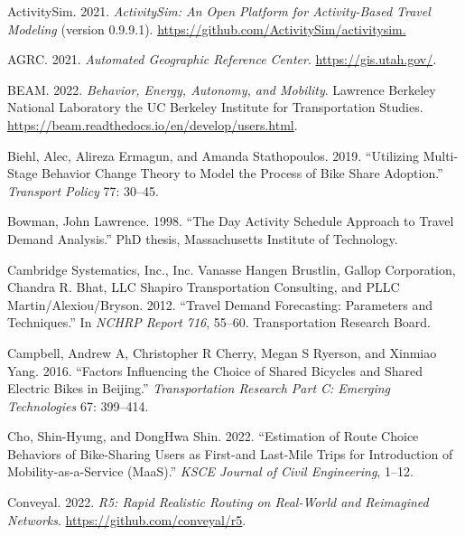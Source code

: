 \documentclass[12pt, oneside, openright]{byuthesis}
\newlength{\cslhangindent}
\newlength{\cslentryspacingunit} %
\newenvironment{CSLReferences}[2] %
 {%
  \setlength{\parindent}{0pt}
  \ifodd #1
  \let\oldpar\par
  \def\par{\hangindent=\cslhangindent\oldpar}
  \fi
  \setlength{\parskip}{#2\cslentryspacingunit}
 }%
 {}
\begin{document}
\hypertarget{refs}{}
\begin{CSLReferences}{1}{0}
\leavevmode{}%
ActivitySim. 2021. \emph{ActivitySim: An Open Platform for Activity-Based Travel Modeling} (version 0.9.9.1). \url{https://github.com/ActivitySim/activitysim.}

\leavevmode{}%
AGRC. 2021. \emph{Automated Geographic Reference Center}. \url{https://gis.utah.gov/}.

\leavevmode{}%
BEAM. 2022. \emph{Behavior, Energy, Autonomy, and Mobility}. Lawrence Berkeley National Laboratory the UC Berkeley Institute for Transportation Studies. \url{https://beam.readthedocs.io/en/develop/users.html}.

\leavevmode{}%
Biehl, Alec, Alireza Ermagun, and Amanda Stathopoulos. 2019. {``Utilizing Multi-Stage Behavior Change Theory to Model the Process of Bike Share Adoption.''} \emph{Transport Policy} 77: 30--45.

\leavevmode{}%
Bowman, John Lawrence. 1998. {``The Day Activity Schedule Approach to Travel Demand Analysis.''} PhD thesis, Massachusetts Institute of Technology.

\leavevmode{}%
Cambridge Systematics, Inc., Inc. Vanasse Hangen Brustlin, Gallop Corporation, Chandra R. Bhat, LLC Shapiro Transportation Consulting, and PLLC Martin/Alexiou/Bryson. 2012. {``Travel Demand Forecasting: Parameters and Techniques.''} In \emph{NCHRP Report 716}, 55--60. Transportation Research Board.

\leavevmode{}%
Campbell, Andrew A, Christopher R Cherry, Megan S Ryerson, and Xinmiao Yang. 2016. {``Factors Influencing the Choice of Shared Bicycles and Shared Electric Bikes in Beijing.''} \emph{Transportation Research Part C: Emerging Technologies} 67: 399--414.

\leavevmode{}%
Cho, Shin-Hyung, and DongHwa Shin. 2022. {``Estimation of Route Choice Behaviors of Bike-Sharing Users as First-and Last-Mile Trips for Introduction of Mobility-as-a-Service (MaaS).''} \emph{KSCE Journal of Civil Engineering}, 1--12.

\leavevmode{}%
Conveyal. 2022. \emph{R5: Rapid Realistic Routing on Real-World and Reimagined Networks}. \url{https://github.com/conveyal/r5}.


\end{CSLReferences}
\end{document}
